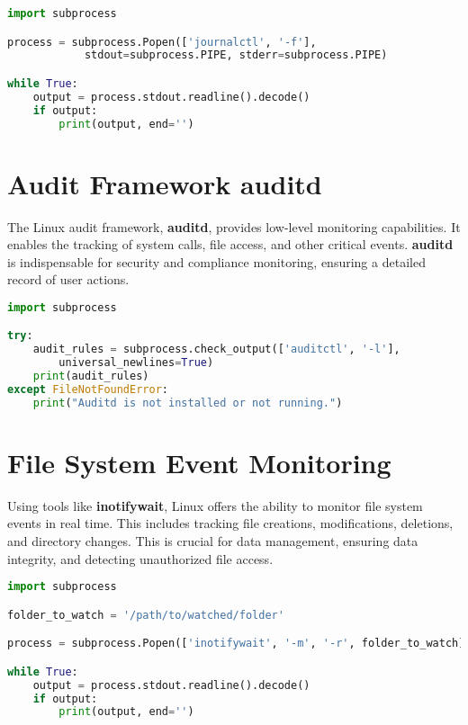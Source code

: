 \documentclass{VUMIFPSmagistrinis}
\begin{document}
\begin{lstlisting}[language=Python]
import subprocess

process = subprocess.Popen(['journalctl', '-f'], 
            stdout=subprocess.PIPE, stderr=subprocess.PIPE)

while True:
    output = process.stdout.readline().decode()
    if output:
        print(output, end='')
\end{lstlisting}

\section{Audit Framework auditd}
The Linux audit framework, \textbf{auditd}, provides low-level monitoring capabilities. It enables the tracking of system calls, file access, and other critical events. \textbf{auditd} is indispensable for security and compliance monitoring, ensuring a detailed record of user actions.
\begin{lstlisting}[language=Python]
import subprocess

try:
    audit_rules = subprocess.check_output(['auditctl', '-l'], 
        universal_newlines=True)
    print(audit_rules)
except FileNotFoundError:
    print("Auditd is not installed or not running.")
\end{lstlisting}

\section{File System Event Monitoring}
Using tools like \textbf{inotifywait}, Linux offers the ability to monitor file system events in real time. This includes tracking file creations, modifications, deletions, and directory changes. This is crucial for data management, ensuring data integrity, and detecting unauthorized file access.
\begin{lstlisting}[language=Python]
import subprocess

folder_to_watch = '/path/to/watched/folder'

process = subprocess.Popen(['inotifywait', '-m', '-r', folder_to_watch], stdout=subprocess.PIPE, stderr=subprocess.PIPE)

while True:
    output = process.stdout.readline().decode()
    if output:
        print(output, end='')
\end{lstlisting}
\end{document}
